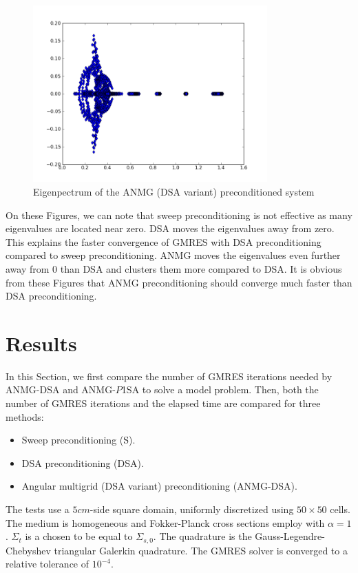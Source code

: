 \documentclass[preprint,10pt]{elsarticle}
\renewcommand{\(}{\left(}
\renewcommand{\)}{\right)}
\renewcommand{\[}{\left[}
\renewcommand{\]}{\right]}
\begin{document}
\begin{figure}[H]
\centering
\includegraphics[width=9cm]{p_s8_5_5}
\caption{Eigenpectrum of the ANMG (DSA variant) preconditioned system}
\label{fig:spectrum_ANMG}
\end{figure}

On these Figures, we can note that sweep preconditioning is not effective as many eigenvalues
are located near zero. DSA moves the eigenvalues away from zero. This explains the faster convergence 
of GMRES with DSA preconditioning compared to sweep preconditioning. ANMG moves the
eigenvalues even further away from 0 than DSA and clusters them more compared to DSA.
It is obvious from these Figures that ANMG preconditioning should converge much faster than
DSA preconditioning. %

\section{Results} \label{sec:results}

In this Section, we first compare the number of GMRES iterations needed by 
ANMG-DSA and ANMG-$P$1SA to solve a model problem. Then, both the number of GMRES 
iterations and the elapsed time are compared for three methods:
\begin{itemize}
\item Sweep preconditioning (S).
\item DSA preconditioning (DSA).
\item Angular multigrid (DSA variant) preconditioning (ANMG-DSA).
\end{itemize}
The tests use a  $5cm$-side square domain, uniformly discretized using $50\times 50$ cells. 
The medium is homogeneous and Fokker-Planck cross sections employ with $\alpha=1$. 
$\Sigma_{t}$ is a chosen to be equal to $\Sigma_{s,0}$. 
The quadrature is the Gauss-Legendre-Chebyshev triangular Galerkin
quadrature.  The GMRES solver is converged to a relative tolerance of $10^{-4}$.
\end{document}
